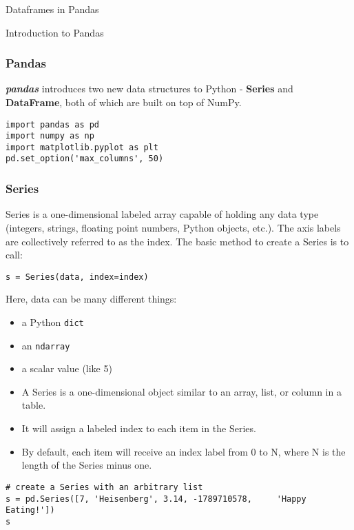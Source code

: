 \begin{frame}[fragile]\frametitle{}
\begin{center}
{\Large Dataframes in Pandas}
\end{center}
\end{frame}

\begin{frame}
  \begin{center}
    {\Large Introduction to Pandas}
  \end{center}
\end{frame}

\begin{frame}[fragile]\frametitle{Pandas}	
\textbf{\textit{pandas}} introduces two new data structures to Python - \textbf{Series} and \textbf{DataFrame}, both of which are built on top of NumPy.
\begin{lstlisting}
import pandas as pd
import numpy as np
import matplotlib.pyplot as plt
pd.set_option('max_columns', 50)
\end{lstlisting}
\end{frame}

\begin{frame}[fragile]\frametitle{Series}
Series is a one-dimensional labeled array capable of holding any data type (integers, strings, floating point numbers, Python objects, etc.). The axis labels are collectively referred to as the index. The basic method to create a Series is to call:
\begin{lstlisting}
s = Series(data, index=index)
\end{lstlisting}
 Here, data can be many different things:
\begin{itemize}
\item a Python \texttt{dict}
\item an \texttt{ndarray}
\item a scalar value (like 5)
\end{itemize}
\end{frame}

\begin{frame}[fragile]
\begin{itemize}
\item A Series is a one-dimensional object similar to an array, list, or column in a table. 
\item It will assign a labeled index to each item in the Series. \item By default, each item will receive an index label from 0 to N, where N is the length of the Series minus one.
\end{itemize}
\begin{lstlisting}
# create a Series with an arbitrary list
s = pd.Series([7, 'Heisenberg', 3.14, -1789710578,     'Happy Eating!'])
s
\end{lstlisting}
\end{frame}

